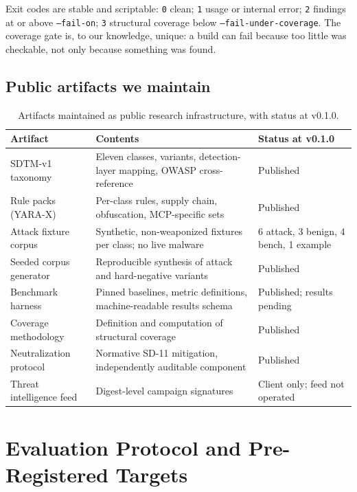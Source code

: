 \documentclass[11pt]{article}
\begin{document}
Exit codes are stable and scriptable: \texttt{0} clean; \texttt{1} usage or internal error; \texttt{2} findings at or above \texttt{--fail-on}; \texttt{3} structural coverage below \texttt{--fail-under-coverage}. The coverage gate is, to our knowledge, unique: a build can fail because too little was checkable, not only because something was found.

\subsection{Public artifacts we maintain}

\begin{table}[htbp]
\centering
\caption{Artifacts maintained as public research infrastructure, with status at v0.1.0.}
\label{tab:artifacts}
\small
\begin{tabularx}{\textwidth}{p{}Xl}
\toprule
Artifact & Contents & Status at v0.1.0 \\
\midrule
SDTM-v1 taxonomy & Eleven classes, variants, detection-layer mapping, OWASP cross-reference & Published \\
Rule packs (YARA-X) & Per-class rules, supply chain, obfuscation, MCP-specific sets & Published \\
Attack fixture corpus & Synthetic, non-weaponized fixtures per class; no live malware & 6 attack, 3 benign, 4 bench, 1 example \\
Seeded corpus generator & Reproducible synthesis of attack and hard-negative variants & Published \\
Benchmark harness & Pinned baselines, metric definitions, machine-readable results schema & Published; results pending \\
Coverage methodology & Definition and computation of structural coverage & Published \\
Neutralization protocol & Normative SD-11 mitigation, independently auditable component & Published \\
Threat intelligence feed & Digest-level campaign signatures & Client only; feed not operated \\
\bottomrule
\end{tabularx}
\end{table}

\section{Evaluation Protocol and Pre-Registered Targets}
\label{sec:eval}
\end{document}
